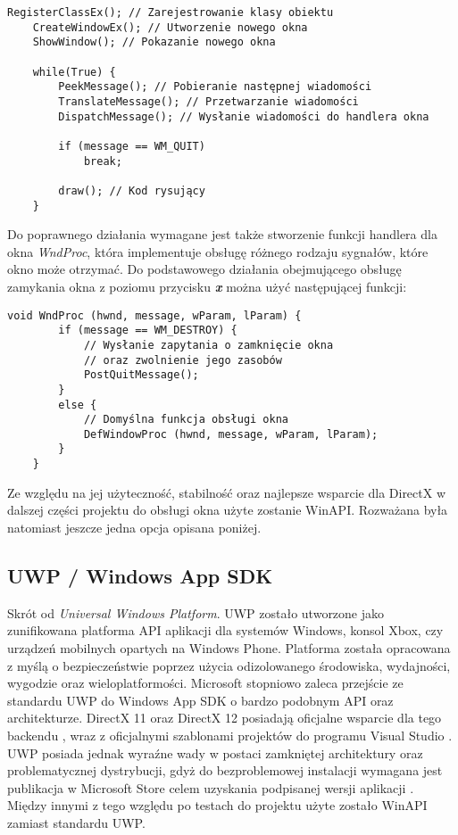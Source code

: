 \begin{lstlisting}[caption={Pseudokod inicjalizacji okna WinAPI (oryginalna treść)}, label={lst:winapi_init}]
	RegisterClassEx(); // Zarejestrowanie klasy obiektu
	CreateWindowEx(); // Utworzenie nowego okna
	ShowWindow(); // Pokazanie nowego okna
	
	while(True) {
		PeekMessage(); // Pobieranie następnej wiadomości
		TranslateMessage(); // Przetwarzanie wiadomości
		DispatchMessage(); // Wysłanie wiadomości do handlera okna
	
		if (message == WM_QUIT)
			break;
		
		draw(); // Kod rysujący
	}
\end{lstlisting}

Do poprawnego działania wymagane jest także stworzenie funkcji handlera
dla okna \emph{WndProc}, która implementuje obsługę różnego rodzaju
sygnałów, które okno może otrzymać. Do podstawowego działania
obejmującego obsługę zamykania okna z poziomu przycisku
\emph{\textbf{x}} można użyć następującej funkcji:

\begin{lstlisting}[caption={Pseudokod funkcji WndProc dla WinAPI (oryginalna treść)}, label={lst:winapi_wndproc}]
	void WndProc (hwnd, message, wParam, lParam) {
		if (message == WM_DESTROY) {
			// Wysłanie zapytania o zamknięcie okna
			// oraz zwolnienie jego zasobów		
			PostQuitMessage();	
		}
		else {
			// Domyślna funkcja obsługi okna
			DefWindowProc (hwnd, message, wParam, lParam);
		}
	}
\end{lstlisting}

Ze względu na jej użyteczność, stabilność oraz najlepsze wsparcie dla
DirectX w dalszej części projektu do obsługi okna użyte zostanie WinAPI. Rozważana była natomiast jeszcze jedna opcja opisana poniżej.

\subsection{UWP / Windows App SDK}

Skrót od \emph{Universal Windows Platform}. UWP zostało utworzone jako
zunifikowana platforma API aplikacji dla systemów Windows, konsol Xbox,
czy urządzeń mobilnych opartych na Windows Phone. Platforma została
opracowana z myślą o bezpieczeństwie poprzez użycia odizolowanego
środowiska, wydajności, wygodzie oraz wieloplatformości. Microsoft
stopniowo zaleca przejście ze standardu UWP do Windows App SDK o bardzo
podobnym API oraz architekturze. DirectX 11 oraz DirectX 12 posiadają oficjalne wsparcie dla tego
backendu \cite{ms:dxuwp:2024}, wraz z oficjalnymi szablonami projektów do programu
Visual Studio \cite{ms:dxuwpui:2024}. UWP posiada jednak wyraźne wady w postaci zamkniętej architektury oraz
problematycznej dystrybucji, gdyż do bezproblemowej instalacji wymagana
jest publikacja w Microsoft Store celem uzyskania podpisanej wersji
aplikacji \cite{ms:uwppackaging:2024}. Między innymi z tego względu po testach do projektu użyte zostało WinAPI
zamiast standardu UWP.

